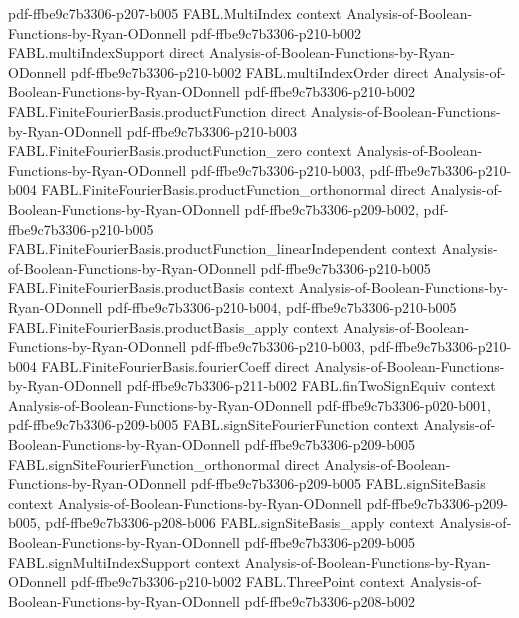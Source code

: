 \begin{theorem}
  {pdf-ffbe9c7b3306-p207-b005}
\proofstep
  {FABL.MultiIndex}
  {context}
  {Analysis-of-Boolean-Functions-by-Ryan-ODonnell}
  {pdf-ffbe9c7b3306-p210-b002}
\proofstep
  {FABL.multiIndexSupport}
  {direct}
  {Analysis-of-Boolean-Functions-by-Ryan-ODonnell}
  {pdf-ffbe9c7b3306-p210-b002}
\proofstep
  {FABL.multiIndexOrder}
  {direct}
  {Analysis-of-Boolean-Functions-by-Ryan-ODonnell}
  {pdf-ffbe9c7b3306-p210-b002}
\proofstep
  {FABL.FiniteFourierBasis.productFunction}
  {direct}
  {Analysis-of-Boolean-Functions-by-Ryan-ODonnell}
  {pdf-ffbe9c7b3306-p210-b003}
\proofstep
  {FABL.FiniteFourierBasis.productFunction_zero}
  {context}
  {Analysis-of-Boolean-Functions-by-Ryan-ODonnell}
  {pdf-ffbe9c7b3306-p210-b003,
    pdf-ffbe9c7b3306-p210-b004}
\proofstep
  {FABL.FiniteFourierBasis.productFunction_orthonormal}
  {direct}
  {Analysis-of-Boolean-Functions-by-Ryan-ODonnell}
  {pdf-ffbe9c7b3306-p209-b002,
    pdf-ffbe9c7b3306-p210-b005}
\proofstep
  {FABL.FiniteFourierBasis.productFunction_linearIndependent}
  {context}
  {Analysis-of-Boolean-Functions-by-Ryan-ODonnell}
  {pdf-ffbe9c7b3306-p210-b005}
\proofstep
  {FABL.FiniteFourierBasis.productBasis}
  {context}
  {Analysis-of-Boolean-Functions-by-Ryan-ODonnell}
  {pdf-ffbe9c7b3306-p210-b004,
    pdf-ffbe9c7b3306-p210-b005}
\proofstep
  {FABL.FiniteFourierBasis.productBasis_apply}
  {context}
  {Analysis-of-Boolean-Functions-by-Ryan-ODonnell}
  {pdf-ffbe9c7b3306-p210-b003,
    pdf-ffbe9c7b3306-p210-b004}
\proofstep
  {FABL.FiniteFourierBasis.fourierCoeff}
  {direct}
  {Analysis-of-Boolean-Functions-by-Ryan-ODonnell}
  {pdf-ffbe9c7b3306-p211-b002}
\proofstep
  {FABL.finTwoSignEquiv}
  {context}
  {Analysis-of-Boolean-Functions-by-Ryan-ODonnell}
  {pdf-ffbe9c7b3306-p020-b001,
    pdf-ffbe9c7b3306-p209-b005}
\proofstep
  {FABL.signSiteFourierFunction}
  {context}
  {Analysis-of-Boolean-Functions-by-Ryan-ODonnell}
  {pdf-ffbe9c7b3306-p209-b005}
\proofstep
  {FABL.signSiteFourierFunction_orthonormal}
  {direct}
  {Analysis-of-Boolean-Functions-by-Ryan-ODonnell}
  {pdf-ffbe9c7b3306-p209-b005}
\proofstep
  {FABL.signSiteBasis}
  {context}
  {Analysis-of-Boolean-Functions-by-Ryan-ODonnell}
  {pdf-ffbe9c7b3306-p209-b005,
    pdf-ffbe9c7b3306-p208-b006}
\proofstep
  {FABL.signSiteBasis_apply}
  {context}
  {Analysis-of-Boolean-Functions-by-Ryan-ODonnell}
  {pdf-ffbe9c7b3306-p209-b005}
\proofstep
  {FABL.signMultiIndexSupport}
  {context}
  {Analysis-of-Boolean-Functions-by-Ryan-ODonnell}
  {pdf-ffbe9c7b3306-p210-b002}
\proofstep
  {FABL.ThreePoint}
  {context}
  {Analysis-of-Boolean-Functions-by-Ryan-ODonnell}
  {pdf-ffbe9c7b3306-p208-b002}

\end{theorem}
